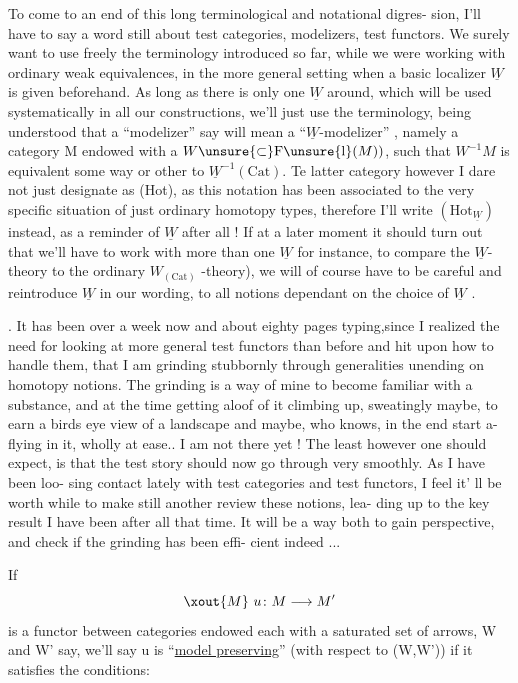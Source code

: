 
To come to an end of this long terminological and notational digres-%
sion,  I'll have to say a word still about test categories,  modelizers,
test functors.  We surely want to use freely the terminology introduced
so far,  while we were working with ordinary weak equivalences,  in the
more general setting when a basic localizer $\underline{W}$ is given beforehand.  As
long as there is only one $\underline{W}$ around,  which will be used systematically in
all our constructions,  we'll just use the  terminology,  being understood
that a ``modelizer'' say will mean a ``$\underline{W}$-modelizer'' ,  namely a category
M endowed with a  $W\unsure{\subset} \mathrm{F}\unsure{\mathrm{l}}(M))$,  such that $W^{-1}M$ is equivalent some way or
other to $\underline{W}^{-1}(\mathrm{Cat})$.  Te latter category however I dare not just designate
as (Hot),  as this notation has been associated to the very specific
situation of just ordinary homotopy types,  therefore I'll  write
$(\mathrm{Hot}_{\underline{W}})$  instead,  as a reminder of $\underline{W}$ after all !  If at a later moment
it should turn out that we'll have to work with more than one $\underline{W}$  \hand{(} for
instance,  to compare the $\underline{W}$-theory to the ordinary $W_{(\mathrm{Cat})}$ -theory),  we
will of course have to be careful and reintroduce $\underline{W}$  in our
wording,  to  all notions dependant on the choice of $\underline{W}$ .


.  It has been over a week now and about eighty pages typing,since I
realized the need for looking at more general test functors than before
and hit upon how to handle them, that I am grinding stubbornly through
generalities unending on homotopy notions.  The grinding is a way of mine
to become familiar with a substance,  and at the  time getting aloof of it\unsure{\hand{,}}
climbing up,  sweatingly maybe,  to earn a birds eye view of a landscape
and maybe,  who knows,  in the end start a-flying in it, wholly at ease..
I am not there yet !  The least however one should expect,  is that
the test story should now go through very smoothly. As I have been loo-%
sing contact lately with test categories and test functors,  I feel it'
ll be worth while to make still another review  these notions,  lea-%
ding up to the key result I have been after all that time.  It will be
a way both to gain perspective,  and check if the grinding has been effi-%
cient indeed ...

If
\[ \xout{M}\ u\colon M \longrightarrow M' \]
is a functor between categories endowed each with a saturated set of
arrows,  W and W' say,  we'll say u is ``\uline{model preserving}''  (with respect
to (W,W')) if it satisfies the conditions:

